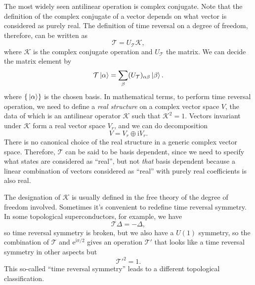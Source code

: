 \documentclass[hyperref, a4paper]{article}
\newcommand*{\ii}{\mathrm{i}}
\newcommand*{\ee}{\mathrm{e}}
\begin{document}
The most widely seen antilinear operation is complex conjugate. Note that the definition of the complex 
conjugate of a vector depends on what vector is considered as purely real. 
The definition of time reversal on a degree of freedom, therefore, can be written as
\begin{equation}
    \mathcal{T} = U_{\mathcal{T}} \mathcal{K},
\end{equation}
where $\mathcal{K}$ is the complex conjugate operation and $U_\mathcal{T}$ the matrix. We can decide the 
matrix element by 
\begin{equation}
    \mathcal{T} \ket*{\alpha} = \sum_\beta (U_\mathcal{T})_{\alpha \beta }\ket*{\beta}.
\end{equation}
where $\{\ket*{\alpha}\}$ is the chosen basis. 
In mathematical terms, to perform time reversal operation, we need to define a \emph{real structure} on a 
complex vector space $V$, the data of which is an antilinear operator $\mathcal{K}$ such that $\mathcal{K}^2 = 1$.
Vectors invariant under $\mathcal{K}$ form a real vector space $V_r$, and we can do decomposition 
\begin{equation}
    V = V_r \oplus \ii V_r.
\end{equation}
There is no canonical choice of the real structure in a generic complex vector space.
Therefore, $\mathcal{T}$ can be said to be basis dependent, since we need to specify what states are 
considered as ``real'', but not \emph{that} basis dependent because a linear combination of 
vectors considered as ``real'' with purely real coefficients is also real.

The designation of $\mathcal{K}$ is usually defined in the free theory of the degree of freedom involved.
Sometimes it's convenient to redefine time reversal symmetry. In some topological superconductors, for example, 
we have 
\begin{equation}
    \mathcal{T} \Delta = - \Delta, 
\end{equation}
so time reversal symmetry is broken, but we also have a $U(1)$ symmetry, so the combination of $\mathcal{T}$
and $\ee^{\ii \pi / 2}$ gives an operation $\mathcal{T}'$ that looks like a time reversal symmetry in 
other aspects but 
\begin{equation}
    \mathcal{T}'^2 = 1.
    \label{eq:so-called-time-reversal}
\end{equation}
This so-called ``time reversal symmetry'' leads to a different topological classification.
\end{document}
